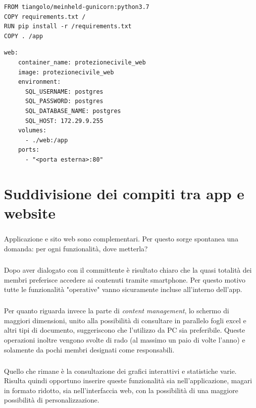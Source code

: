 \documentclass[12pt,a4paper,twoside,english,italian]{book}
\begin{document}
\begin{lstlisting}[caption=Dockerfile]
FROM tiangolo/meinheld-gunicorn:python3.7
COPY requirements.txt /
RUN pip install -r /requirements.txt
COPY . /app
\end{lstlisting}

\begin{lstlisting}[caption=File di configurazione per Docker compose]
web:
    container_name: protezionecivile_web
    image: protezionecivile_web
    environment:
      SQL_USERNAME: postgres
      SQL_PASSWORD: postgres
      SQL_DATABASE_NAME: postgres
      SQL_HOST: 172.29.9.255
    volumes:
      - ./web:/app
    ports:
      - "<porta esterna>:80"
\end{lstlisting}



\chapter{Suddivisione dei compiti tra app e website}

\paragraph{} Applicazione e sito web sono complementari. Per questo sorge spontanea una domanda: per ogni funzionalità, dove metterla? 

\paragraph{} Dopo aver dialogato con il committente è risultato chiaro che la quasi totalità dei membri preferisce accedere ai contenuti tramite smartphone. Per questo motivo tutte le funzionalità "operative" vanno sicuramente incluse all'interno dell'app. 

\paragraph{} Per quanto riguarda invece la parte di \emph{content management}, lo schermo di maggiori dimensioni, unito alla possibilità di consultare in parallelo fogli excel e altri tipi di documento, suggeriscono che l'utilizzo da PC sia preferibile. Queste operazioni inoltre vengono svolte di rado (al massimo un paio di volte l'anno) e solamente da pochi membri designati come responsabili. 

\paragraph{} Quello che rimane è la consultazione dei grafici interattivi e statistiche varie. Risulta quindi opportuno inserire queste funzionalità sia nell'applicazione, magari in formato ridotto, sia nell'interfaccia web, con la possibilità di una maggiore possibilità di personalizzazione.
\end{document}
